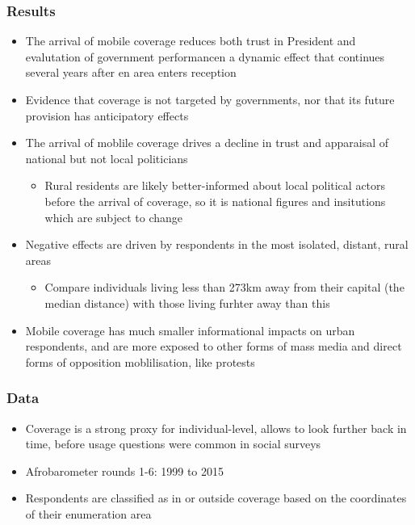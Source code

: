\documentclass[11pt]{article}
\begin{document}
\subsubsection*{Results}
\begin{itemize}
    \item The arrival of mobile coverage reduces both trust in President and evalutation of government performancen a dynamic effect that continues several years after en area enters reception
    \item Evidence that coverage is not targeted by governments, nor that its future provision has anticipatory effects
    \item The arrival of moblile coverage drives a decline in trust and apparaisal of national but not local politicians
    \begin{itemize}
        \item Rural residents are likely better-informed about local political actors before the arrival of coverage, so it is national figures and insitutions which are subject to change
    \end{itemize}
    \item Negative effects are driven by respondents in the most isolated, distant, rural areas
    \begin{itemize}
        \item Compare individuals living less than 273km away from their capital (the median distance) with those living furhter away than this
    \end{itemize}
    \item Mobile coverage has much smaller informational impacts on urban respondents, and are more exposed to other forms of mass media and direct forms of opposition moblilisation, like protests
\end{itemize}
\subsubsection*{Data}
\begin{itemize}
    \item Coverage is a strong proxy for individual-level, allows to look further back in time, before usage questions were common in social surveys
    \item Afrobarometer rounds 1-6: 1999 to 2015
    \item Respondents are classified as in or outside coverage based on the coordinates of their enumeration area
\end{itemize}
\end{document}

